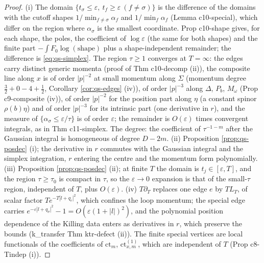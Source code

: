 \documentclass[11pt]{article}
\numberwithin{equation}{section}
\theoremstyle{plain}
\theoremstyle{definition}
\begin{document}
\begin{proof}
(i) The domain $\{t_\sigma\le\varepsilon,\ t_f\ge\varepsilon\ (f\ne\sigma)\}$ is the difference of the domains with the cutoff shapes $1/\min_{f\ne\sigma}\alpha_f$ and $1/\min_f\alpha_f$ (Lemma c10-special), which differ on the region where $\alpha_\sigma$ is the smallest coordinate. Prop c10-shape gives, for each shape, the poles, the coefficient of $\log\varepsilon$ (the same for both shapes) and the finite part $-\int F_0\log(\text{shape})$ plus a shape-independent remainder; the difference is \eqref{eq:qs-simplex}. The region $\tau\ge1$ converges at $T=\infty$: the edges carry distinct generic momenta (proof of Thm c10-decomp (ii)), the composite line along $x$ is of order $|p|^{-2}$ at small momentum along $\Sigma$ (momentum degree $\tfrac32+0-4+\tfrac12$, Corollary \ref{cor:qs-edges} (iv)), of order $|p|^{-3}$ along $\Delta$, $P_b$, $M_\omega$ (Prop c9-composite (iv)), of order $|p|^{-2}$ for the position part along $\eta$ (a constant spinor $\rho(b)\eta$) and of order $|p|^{-3}$ for its intrinsic part (one derivative in $r$), and the measure of $\{\alpha_\sigma\le\varepsilon/\tau\}$ is of order $\varepsilon$; the remainder is $O(\varepsilon)$ times convergent integrals, as in Thm c11-simplex. The degree: the coefficient of $\tau^{-1-m}$ after the Gaussian integral is homogeneous of degree $D-2m$. (ii) Proposition \ref{prop:qs-posdec} (i); the derivative in $r$ commutes with the Gaussian integral and the simplex integration, $r$ entering the centre and the momentum form polynomially. (iii) Proposition \ref{prop:qs-posdec} (ii); at finite $T$ the domain is $t_j\in[\varepsilon,T]$, and the region $\tau\ge\tau_0$ is compact in $\tau$, so the $\varepsilon\to0$ expansion is that of the small-$\tau$ region, independent of $T$, plus $O(\varepsilon)$. (iv) $T\partial_T$ replaces one edge $e$ by $TL_T$, of scalar factor $Te^{-T|l+q_e|^2}$, which confines the loop momentum; the special edge carries $e^{-\varepsilon|l+q_\sigma|^2}-1=O(\varepsilon(1+|l|)^2)$, and the polynomial position dependence of the Killing data enters as derivatives in $r$, which preserve the bounds (k\_transfer Thm ktr-defect (ii)). The finite special vertices are local functionals of the coefficients of $\mathrm{ct}_m$, $\mathrm{ct}^{(1)}_{x,m}$, which are independent of $T$ (Prop c8-Tindep (i)).
\end{proof}
\end{document}
